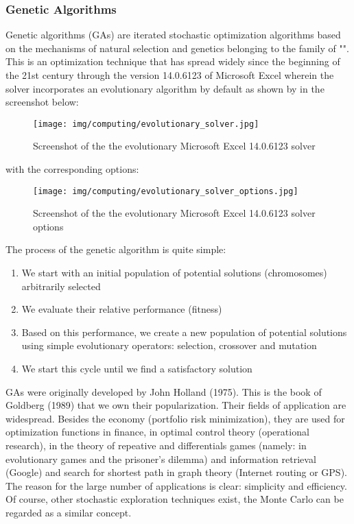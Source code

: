 	\subsubsection{Genetic Algorithms}
	Genetic algorithms (GAs) are iterated  stochastic optimization algorithms based on the mechanisms of natural selection and genetics belonging to the family of "". This is an optimization technique that has spread widely since the beginning of the 21st century through the version 14.0.6123 of Microsoft Excel wherein the solver incorporates an evolutionary algorithm by default as shown by in the screenshot below:
	\begin{figure}[H]
		\centering
		\texttt{[image: img/computing/evolutionary\_solver.jpg]}
		\caption[]{Screenshot of the the evolutionary Microsoft Excel 14.0.6123 solver}
	\end{figure}
	with the corresponding options:
	\begin{figure}[H]
		\centering
		\texttt{[image: img/computing/evolutionary\_solver\_options.jpg]}
		\caption[]{Screenshot of the the evolutionary Microsoft Excel 14.0.6123 solver options}
	\end{figure}
	The process of the genetic algorithm is quite simple:
	\begin{enumerate}
		\item We start with an initial population of potential solutions (chromosomes) arbitrarily selected 

		\item We evaluate their relative performance (fitness) 

		\item Based on this performance, we create a new population of potential solutions using simple evolutionary operators: selection, crossover and mutation

		\item We start this cycle until we find a satisfactory solution
	\end{enumerate}
	GAs were originally developed by John Holland (1975). This is the book of Goldberg (1989) that we own their popularization. Their fields of application are widespread. Besides the economy (portfolio risk minimization), they are used for optimization functions in  finance, in optimal control theory (operational research), in the theory of repeative and differentials games (namely: in evolutionary games and the prisoner's dilemma) and information retrieval (Google) and search for shortest path in graph theory (Internet routing or GPS). The reason for the large number of applications is clear: simplicity and efficiency. Of course, other stochastic exploration techniques exist, the Monte Carlo can be regarded as a similar concept.
	

